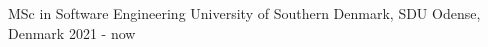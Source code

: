 \begin{cventries}
\cventry
{MSc in Software Engineering} %
{University of Southern Denmark, SDU} %
{Odense, Denmark} %
{2021 - now} %
{}
\end{cventries}
